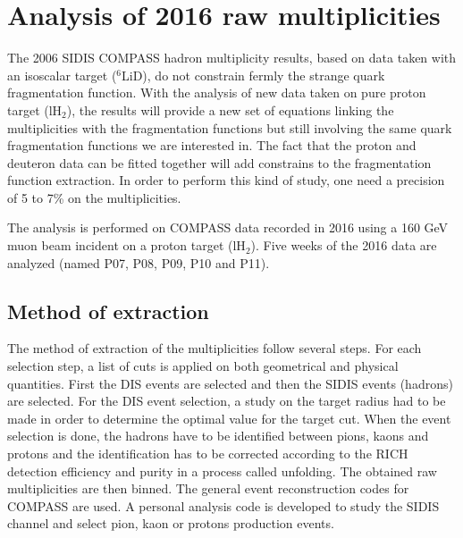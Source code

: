 
\chapter{Analysis of 2016 raw multiplicities} %

\label{ch:raw} %

The 2006 SIDIS COMPASS hadron multiplicity results, based on data taken with an isoscalar target ($^6$LiD), do not constrain fermly the strange quark fragmentation function.
With the analysis of new data taken on pure proton target (lH$_2$), the results will provide a new set of equations linking the multiplicities with the fragmentation functions but still involving the same quark fragmentation functions we are interested in. The fact that the proton and deuteron data can be fitted together will add constrains to the fragmentation function extraction.
In order to perform this kind of study, one need a precision of 5 to 7\% on the multiplicities.

The analysis is performed on COMPASS data recorded in 2016 using a 160 GeV muon beam incident on a proton target (lH$_2$). Five weeks of the 2016 data are analyzed (named P07, P08, P09, P10 and P11).


\section{Method of extraction}

The method of extraction of the multiplicities follow several steps. For each selection step,
a list of cuts is applied on both geometrical and physical quantities. First the DIS events are selected
and then the SIDIS events (hadrons) are selected. For the DIS event selection, a study on the target radius had to be made in order to determine the optimal value for the target cut. When the event selection is done, the hadrons have to be identified between pions, kaons and protons and the identification has to be corrected according to the RICH detection efficiency and purity in a process called unfolding. The obtained raw multiplicities are then binned. The general event reconstruction codes for COMPASS are used. A personal analysis code is developed to study the SIDIS channel and select pion, kaon or protons production events.

